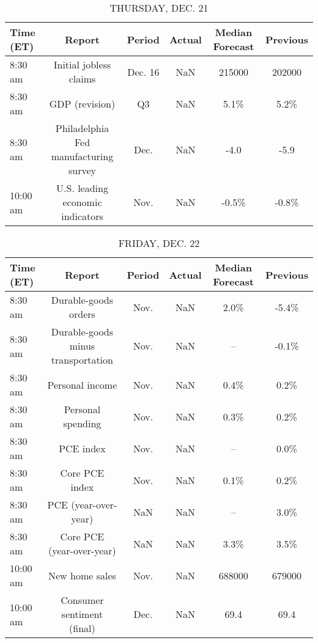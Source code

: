 \documentclass{article}%
\begin{document}
%


\begin{table}[htbp]%
\caption{THURSDAY, DEC. 21}%
\centering%
\begin{adjustbox}{width=1\textwidth}%
\begin{tabular}{lccccc}
\toprule
Time (ET) &                                Report &  Period & Actual & Median Forecast & Previous \\
\midrule
  8:30 am &                Initial jobless claims & Dec. 16 &    NaN &          215000 &   202000 \\
  8:30 am &                        GDP (revision) &      Q3 &    NaN &            5.1\% &     5.2\% \\
  8:30 am & Philadelphia Fed manufacturing survey &    Dec. &    NaN &            -4.0 &     -5.9 \\
 10:00 am &      U.S. leading economic indicators &    Nov. &    NaN &           -0.5\% &    -0.8\% \\
\bottomrule
\end{tabular}
%
\end{adjustbox}%
\end{table}

%


\begin{table}[htbp]%
\caption{FRIDAY, DEC. 22}%
\centering%
\begin{adjustbox}{width=1\textwidth}%
\begin{tabular}{lccccc}
\toprule
Time (ET) &                             Report & Period & Actual & Median Forecast & Previous \\
\midrule
  8:30 am &               Durable-goods orders &   Nov. &    NaN &            2.0\% &    -5.4\% \\
  8:30 am & Durable-goods minus transportation &   Nov. &    NaN &              -- &    -0.1\% \\
  8:30 am &                    Personal income &   Nov. &    NaN &            0.4\% &     0.2\% \\
  8:30 am &                  Personal spending &   Nov. &    NaN &            0.3\% &     0.2\% \\
  8:30 am &                          PCE index &   Nov. &    NaN &              -- &     0.0\% \\
  8:30 am &                     Core PCE index &   Nov. &    NaN &            0.1\% &     0.2\% \\
  8:30 am &               PCE (year-over-year) &    NaN &    NaN &              -- &     3.0\% \\
  8:30 am &          Core PCE (year-over-year) &    NaN &    NaN &            3.3\% &     3.5\% \\
 10:00 am &                     New home sales &   Nov. &    NaN &          688000 &   679000 \\
 10:00 am &         Consumer sentiment (final) &   Dec. &    NaN &            69.4 &     69.4 \\
\bottomrule
\end{tabular}
%
\end{adjustbox}%
\end{table}
\end{document}
